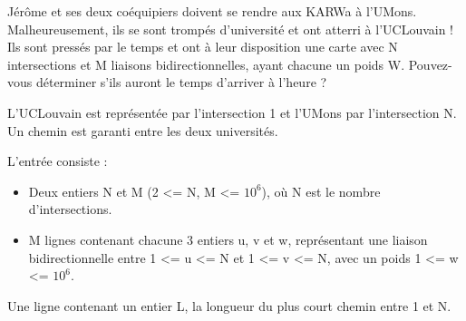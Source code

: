 \problemname{\problemyamlname}



Jérôme et ses deux coéquipiers doivent se rendre aux KARWa à l'UMons. Malheureusement, ils se sont trompés d'université et ont atterri à l'UCLouvain !
Ils sont pressés par le temps et ont à leur disposition une carte avec N intersections et M liaisons bidirectionnelles, ayant chacune un poids W.
Pouvez-vous déterminer s'ils auront le temps d'arriver à l'heure ?

L'UCLouvain est représentée par l'intersection 1 et l'UMons par l'intersection N. Un chemin est garanti entre les deux universités.

\begin{Input}
    L'entrée consiste :
    \begin{itemize}
        \item Deux entiers N et M (2 <= N, M <= $10^6$), où N est le nombre d'intersections.
        \item  M lignes contenant chacune 3 entiers u, v et w, représentant une liaison bidirectionnelle entre 1 <= u <= N et 1 <= v <= N, avec un poids 1 <= w <= $10^6$.
    \end{itemize}
\end{Input}

\begin{Output}
    Une ligne contenant un entier L, la longueur du plus court chemin entre 1 et N.
\end{Output}
